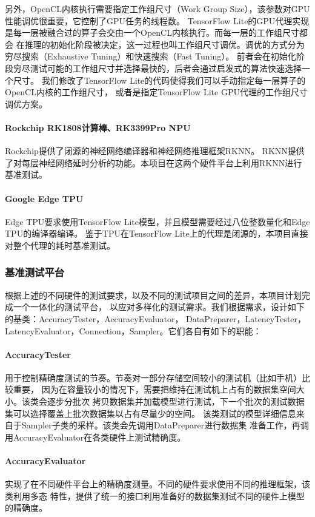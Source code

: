 另外，OpenCL内核执行需要指定工作组尺寸（Work Group Size），该参数对GPU性能调优很重要，它控制了GPU任务的线程数。
TensorFlow Lite的GPU代理实现是每一层被融合过的算子会交由一个OpenCL内核执行。而每一层的工作组尺寸都会
在推理的初始化阶段被决定，这一过程也叫工作组尺寸调优。调优的方式分为穷尽搜索（Exhaustive Tuning）和快速搜索（Fast Tuning）。
前者会在初始化阶段穷尽测试可能的工作组尺寸并选择最快的，后者会通过启发式的算法快速选择一个尺寸。
我们修改了TensorFlow Lite的代码使得我们可以手动指定每一层算子的OpenCL内核的工作组尺寸，
或者是指定TensorFlow Lite GPU代理的工作组尺寸调优方案。

\paragraph{Rockchip RK1808计算棒、RK3399Pro NPU}
Rockchip提供了闭源的神经网络编译器和神经网络推理框架RKNN。
RKNN提供了对每层神经网络延时分析的功能。本项目在这两个硬件平台上利用RKNN进行基准测试。

\paragraph{Google Edge TPU}
Edge TPU要求使用TensorFlow Lite模型，并且模型需要经过八位整数量化和Edge TPU的编译器编译。
鉴于TPU在TensorFlow Lite上的代理是闭源的，本项目直接对整个代理的耗时基准测试。

\subsubsection{基准测试平台}
根据上述的不同硬件的测试要求，以及不同的测试项目之间的差异，本项目计划完成一个一体化的测试平台，
以应对多样化的测试需求。我们根据需求，设计如下的基类：AccuracyTester，AccuracyEvaluator，
DataPreparer，LatencyTester，LatencyEvaluator，Connection，Sampler。它们各自有如下的职能：

\paragraph{AccuracyTester}
用于控制精确度测试的节奏。节奏对一部分存储空间较小的测试机（比如手机）比较重要，
因为在容量较小的情况下，需要把维持在测试机上占有的数据集空间大小。该类会逐步分批次
拷贝数据集并加载模型进行测试，下一个批次的测试数据集可以选择覆盖上批次数据集以占有尽量少的空间。
该类测试的模型详细信息来自于Sampler子类的采样。该类会先调用DataPreparer进行数据集
准备工作，再调用AccuracyEvaluator在各类硬件上测试精确度。

\paragraph{AccuracyEvaluator}
实现了在不同硬件平台上的精确度测量。不同的硬件要求使用不同的推理框架，该类利用多态
特性，提供了统一的接口利用准备好的数据集测试不同的硬件上模型的精确度。

